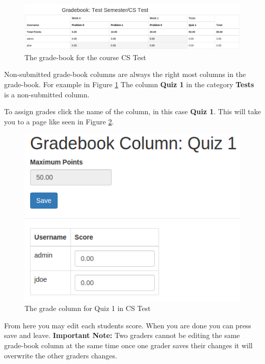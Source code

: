 \documentclass[11pt]{report}
\begin{document}
\begin{figure}
\centering
\includegraphics[width=\textwidth,height=\textheight,keepaspectratio]{diagrams/gradebook}
\caption{The grade-book for the course CS Test}
\label{fig:gradebook}
\end{figure}

Non-submitted grade-book columns are always the right most columns in the grade-book. For example in 
Figure \ref{fig:gradebook} The column \textbf{Quiz 1} in the category \textbf{Tests} is a non-submitted
column. 

To assign grades click the name of the column, in this case \textbf{Quiz 1}. This will take you to a page
like seen in Figure \ref{fig:gradecolumn}.

\begin{figure}
\centering
\includegraphics[width=\textwidth,height=\textheight,keepaspectratio]{diagrams/gradecolumn}
\caption{The grade column for Quiz 1 in CS Test}
\label{fig:gradecolumn}
\end{figure}

From here you may edit each students score. When you are done you can press save and leave. 
\textbf{Important Note:} Two graders cannot be editing the same grade-book column at the same time
once one grader saves their changes it will overwrite the other graders changes.
\end{document}

